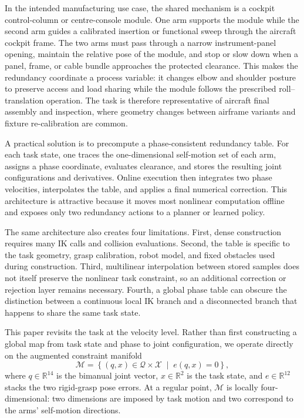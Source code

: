 \documentclass[preprint,12pt]{elsarticle}
\newcommand{\R}{\mathbb{R}}
\begin{document}
In the intended manufacturing use case, the shared mechanism is a cockpit control-column or centre-console module. One arm supports the module while the second arm guides a calibrated insertion or functional sweep through the aircraft cockpit frame. The two arms must pass through a narrow instrument-panel opening, maintain the relative pose of the module, and stop or slow down when a panel, frame, or cable bundle approaches the protected clearance. This makes the redundancy coordinate a process variable: it changes elbow and shoulder posture to preserve access and load sharing while the module follows the prescribed roll--translation operation. The task is therefore representative of aircraft final assembly and inspection, where geometry changes between airframe variants and fixture re-calibration are common.

A practical solution is to precompute a phase-consistent redundancy table. For each task state, one traces the one-dimensional self-motion set of each arm, assigns a phase coordinate, evaluates clearance, and stores the resulting joint configurations and derivatives. Online execution then integrates two phase velocities, interpolates the table, and applies a final numerical correction. This architecture is attractive because it moves most nonlinear computation offline and exposes only two redundancy actions to a planner or learned policy.

The same architecture also creates four limitations. First, dense construction requires many IK calls and collision evaluations. Second, the table is specific to the task geometry, grasp calibration, robot model, and fixed obstacles used during construction. Third, multilinear interpolation between stored samples does not itself preserve the nonlinear task constraint, so an additional correction or rejection layer remains necessary. Fourth, a global phase table can obscure the distinction between a continuous local IK branch and a disconnected branch that happens to share the same task state.

This paper revisits the task at the velocity level. Rather than first constructing a global map from task state and phase to joint configuration, we operate directly on the augmented constraint manifold
\begin{equation}
\mathcal M
=
\left\{(q,x)\in\mathcal Q\times\mathcal X
\;\middle|\;
 e(q,x)=0
\right\},
\label{eq:intro_manifold}
\end{equation}
where $q\in\R^{14}$ is the bimanual joint vector, $x\in\R^2$ is the task state, and $e\in\R^{12}$ stacks the two rigid-grasp pose errors. At a regular point, $\mathcal M$ is locally four-dimensional: two dimensions are imposed by task motion and two correspond to the arms' self-motion directions.
\end{document}
